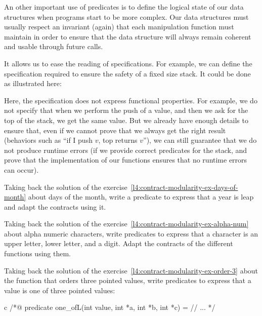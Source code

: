

An other important use of predicates is to define the logical state of
our data structures when programs start to be more complex. Our data
structures must usually respect an invariant (again) that each
manipulation function must maintain in order to ensure that the data
structure will always remain coherent and usable through future calls.



It allows us to ease the reading of specifications. For example, we can
define the specification required to ensure the safety of a fixed size
stack. It could be done as illustrated here:






Here, the specification does not express functional properties. For
example, we do not specify that when we perform the push of a value, and
then we ask for the top of the stack, we get the same value. But we
already have enough details to ensure that, even if we cannot prove that
we always get the right result (behaviors such as ``if I push \(v\), top
returns \(v\)''), we can still guarantee that we do not produce runtime
errors (if we provide correct predicates for the stack, and prove
that the implementation of our functions ensures that no runtime errors
can occur).






Taking back the solution of the
exercise~\ref{l4:contract-modularity-ex-days-of-month} about days of the month,
write a predicate to express that a year is leap and adapt the contracts using
it.




Taking back the solution of the
exercise~\ref{l4:contract-modularity-ex-alpha-num} about alpha numeric
characters, write predicates to express that a character is an upper letter,
lower letter, and a digit. Adapt the contracts of the different functions using
them.




Taking back the solution of the
exercise~\ref{l4:contract-modularity-ex-order-3} about the function that orders
three pointed values, write predicates to express that a value is one of three
pointed values:

\begin{CodeBlock}{c}
/*@
  predicate one_of{L}(int value, int *a, int *b, int *c) =
    // ...
*/
\end{CodeBlock}

